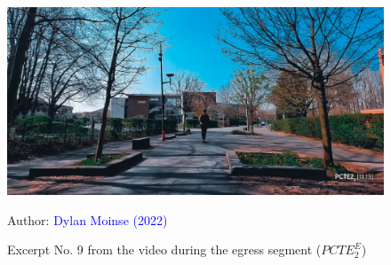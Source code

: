     \begin{figure}[h!]\vspace*{4pt}
        \caption*{Excerpt No. 9 from the video during the egress segment (\(PCTE^{E}_{2}\))}
        \centerline{\includegraphics[width=0.75\columnwidth]{src/Figures/Annexes/Extrait_Video_PCTE2_Egress_9.jpg}}
        \vspace{5pt}
        \begin{flushright}\scriptsize{
        Author: \textcolor{blue}{Dylan Moinse (2022)}
        }\end{flushright}
    \end{figure}